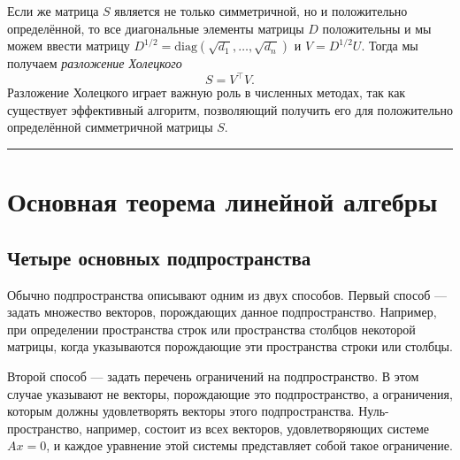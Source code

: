 \documentclass[11pt,a4paper]{article}
\begin{document}
Если же матрица \(S\) является не только симметричной, но и положительно
определённой, то все диагональные элементы матрицы \(D\) положительны и
мы можем ввести матрицу
\(D^{1/2} = \mathrm{diag}\left(\sqrt{d_1}, \dots, \sqrt{d_n}\right)\) и
\(V = D^{1/2}U\).
Тогда мы получаем \emph{разложение Холецкого} \[
  S = V^\top V.
\]
Разложение Холецкого играет важную роль в численных методах, так
как существует эффективный алгоритм, позволяющий получить его для
положительно определённой симметричной матрицы \(S\).

    \begin{center}\rule{0.5\linewidth}{0.5pt}\end{center}

    \hypertarget{ux43eux441ux43dux43eux432ux43dux430ux44f-ux442ux435ux43eux440ux435ux43cux430-ux43bux438ux43dux435ux439ux43dux43eux439-ux430ux43bux433ux435ux431ux440ux44b}{%
\section{Основная теорема линейной
алгебры}\label{ux43eux441ux43dux43eux432ux43dux430ux44f-ux442ux435ux43eux440ux435ux43cux430-ux43bux438ux43dux435ux439ux43dux43eux439-ux430ux43bux433ux435ux431ux440ux44b}}

\hypertarget{ux447ux435ux442ux44bux440ux435-ux43eux441ux43dux43eux432ux43dux44bux445-ux43fux43eux434ux43fux440ux43eux441ux442ux440ux430ux43dux441ux442ux432ux430}{%
\subsection{Четыре основных
подпространства}\label{ux447ux435ux442ux44bux440ux435-ux43eux441ux43dux43eux432ux43dux44bux445-ux43fux43eux434ux43fux440ux43eux441ux442ux440ux430ux43dux441ux442ux432ux430}}

Обычно подпространства описывают одним из двух способов.
Первый способ --- задать множество векторов, порождающих данное подпространство.
Например, при определении пространства строк или пространства столбцов некоторой матрицы, когда указываются порождающие эти пространства строки или столбцы.

Второй способ --- задать перечень ограничений на подпространство.
В этом случае указывают не векторы, порождающие это подпространство, а ограничения, которым должны удовлетворять векторы этого подпространства.
Нуль-пространство, например, состоит из всех векторов, удовлетворяющих системе \(Ax=0\), и каждое уравнение этой системы представляет собой такое ограничение.
\end{document}
